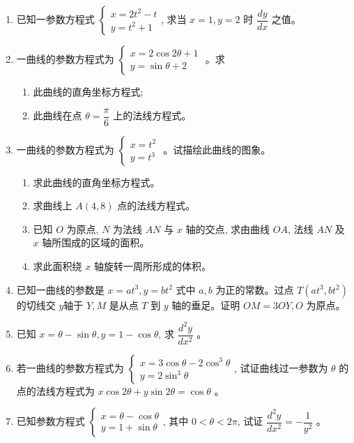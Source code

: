 \documentclass[10pt]{article}
\begin{document}
\begin{enumerate}
  \item 已知一参数方程式 $\left\{\begin{array}{l}x=2 t^{2}-t \\ y=t^{2}+1\end{array}\right.$, 求当 $x=1, y=2$ 时 $\dfrac{d y}{d x}$ 之值。
  \item 一曲线的参数方程式为 $\left\{\begin{array}{l}x=2 \cos 2 \theta+1 \\ y=\sin \theta+2\end{array}\right.$ 。求
  \begin{enumerate}
    \item 此曲线的直角坐标方程式;
    \item 此曲线在点 $\theta=\dfrac{\pi}{6}$ 上的法线方程式。
  \end{enumerate}
  \item 一曲线的参数方程式为 $\left\{\begin{array}{l}x=t^{2} \\ y=t^{3}\end{array}\right.$ 。试描绘此曲线的图象。
  \begin{enumerate}
    \item 求此曲线的直角坐标方程式。
    \item 求曲线上 $A(4,8)$ 点的法线方程式。
    \item 已知 $O$ 为原点, $N$ 为法线 $AN$ 与 $x$ 轴的交点, 求由曲线 $OA$, 法线 $AN$ 及 $x$ 轴所围成的区域的面积。
    \item 求此面积绕 $x$ 轴旋转一周所形成的体积。
  \end{enumerate}
  \item 已知一曲线的参数是 $x=a t^{3}, y=b t^{2}$ 式中 $a, b$ 为正的常数。过点 $T\left(a t^{3}, b t^{2}\right)$ 的切线交 $y$轴于 $Y, M$ 是从点 $T$ 到 $y$ 轴的垂足。证明 $OM=3 OY, O$ 为原点。
  \item 已知 $x=\theta-\sin \theta, y=1-\cos \theta$, 求 $\dfrac{d^{2} y}{d x^{2}}$ 。
  \item 若一曲线的参数方程式为 $\left\{\begin{array}{l}x=3 \cos \theta-2 \cos ^{3} \theta \\ y=2 \sin ^{3} \theta\end{array}\right.$, 试证曲线过一参数为 $\theta$ 的点的法线方程式为 $x \cos 2 \theta+y \sin 2 \theta=\cos \theta$ 。
  \item 已知参数方程式 $\left\{\begin{array}{l}x=\theta-\cos \theta \\ y=1+\sin \theta\end{array}\right.$, 其中 $0<\theta<2 \pi$, 试证 $\dfrac{d^{2} y}{d x^{2}}=-\dfrac{1}{y^{2}}$ 。

\end{enumerate}
\end{document}
